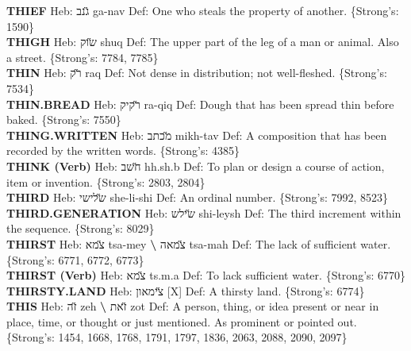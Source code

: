{\textbf{THIEF} Heb: {\large\H גנב} ga-nav Def: One who steals the property of another. \{Strong's: 1590\}\hfill{}\\

\textbf{THIGH} Heb: {\large\H שוק} shuq Def: The upper part of the leg of a man or animal. Also a street. \{Strong's: 7784, 7785\}\hfill{}\\

\textbf{THIN} Heb: {\large\H רק} raq Def: Not dense in distribution; not well-fleshed. \{Strong's: 7534\}\hfill{}\\

\textbf{THIN.BREAD} Heb: {\large\H רקיק} ra-qiq Def: Dough that has been spread thin before baked. \{Strong's: 7550\}\hfill{}\\

\textbf{THING.WRITTEN} Heb: {\large\H מכתב} mikh-tav Def: A composition that has been recorded by the written words. \{Strong's: 4385\}\hfill{}\\

\textbf{THINK (Verb)} Heb: {\large\H חשב} hh.sh.b Def: To plan or design a course of action, item or invention. \{Strong's: 2803, 2804\}\hfill{}\\

\textbf{THIRD} Heb: {\large\H שלישי} she-li-shi Def: An ordinal number. \{Strong's: 7992, 8523\}\hfill{}\\

\textbf{THIRD.GENERATION} Heb: {\large\H שילש} shi-leysh Def: The third increment within the sequence. \{Strong's: 8029\}\hfill{}\\

\textbf{THIRST} Heb: {\large\H צמא} tsa-mey \textbf{\textbackslash{}} {\large\H צמאה} tsa-mah Def: The lack of sufficient water. \{Strong's: 6771, 6772, 6773\}\hfill{}\\

\textbf{THIRST (Verb)} Heb: {\large\H צמא} ts.m.a Def: To lack sufficient water. \{Strong's: 6770\}\hfill{}\\

\textbf{THIRSTY.LAND} Heb: {\large\H צימאון} {[}X{]} Def: A thirsty land. \{Strong's: 6774\}\hfill{}\\

\textbf{THIS} Heb: {\large\H זה} zeh \textbf{\textbackslash{}} {\large\H זאת} zot Def: A person, thing, or idea present or near in place, time, or thought or just mentioned. As prominent or pointed out. \{Strong's: 1454, 1668, 1768, 1791, 1797, 1836, 2063, 2088, 2090, 2097\}\hfill{}\\

}

